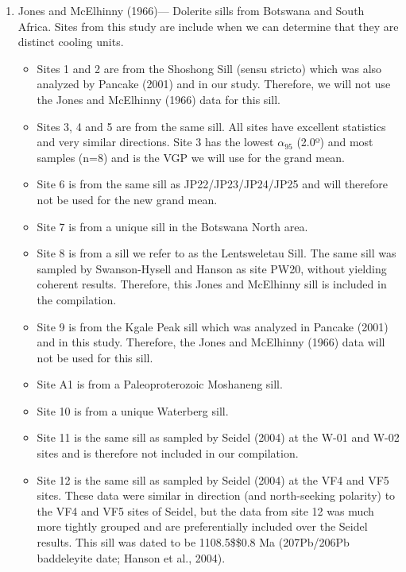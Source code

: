 \documentclass{article}
\providecommand{\tightlist}{%
      \setlength{\itemsep}{0pt}\setlength{\parskip}{0pt}}
\begin{document}
\begin{enumerate}
\def\labelenumi{\arabic{enumi}.}
\item
  Jones and McElhinny (1966)--- Dolerite sills from Botswana and South
  Africa. Sites from this study are include when we can determine that
  they are distinct cooling units.

  \begin{itemize}
  \tightlist
  \item
    Sites 1 and 2 are from the Shoshong Sill (sensu stricto) which was
    also analyzed by Pancake (2001) and in our study. Therefore, we will
    not use the Jones and McElhinny (1966) data for this sill.
  \item
    Sites 3, 4 and 5 are from the same sill. All sites have excellent
    statistics and very similar directions. Site 3 has the lowest
    \(\alpha_{95}\) (2.0º) and most samples (n=8) and is the VGP we will
    use for the grand mean.
  \item
    Site 6 is from the same sill as JP22/JP23/JP24/JP25 and will
    therefore not be used for the new grand mean.
  \item
    Site 7 is from a unique sill in the Botswana North area.
  \item
    Site 8 is from a sill we refer to as the Lentsweletau Sill. The same
    sill was sampled by Swanson-Hysell and Hanson as site PW20, without
    yielding coherent results. Therefore, this Jones and McElhinny sill
    is included in the compilation.
  \item
    Site 9 is from the Kgale Peak sill which was analyzed in Pancake
    (2001) and in this study. Therefore, the Jones and McElhinny (1966)
    data will not be used for this sill.
  \item
    Site A1 is from a Paleoproterozoic Moshaneng sill.
  \item
    Site 10 is from a unique Waterberg sill.
  \item
    Site 11 is the same sill as sampled by Seidel (2004) at the W-01 and
    W-02 sites and is therefore not included in our compilation.
  \item
    Site 12 is the same sill as sampled by Seidel (2004) at the VF4 and
    VF5 sites. These data were similar in direction (and north-seeking
    polarity) to the VF4 and VF5 sites of Seidel, but the data from site
    12 was much more tightly grouped and are preferentially included
    over the Seidel results. This sill was dated to be 1108.5\$\pm\$0.8
    Ma (207Pb/206Pb baddeleyite date; Hanson et al., 2004).

\end{itemize}
\end{enumerate}
\end{document}
